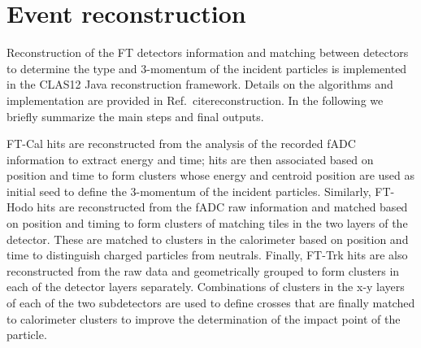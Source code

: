 \section{Event reconstruction}
Reconstruction of the FT detectors information and matching between detectors to determine the type and 3-momentum of the incident particles is implemented in the CLAS12 Java reconstruction framework. Details on the algorithms and implementation are provided in Ref.~cite{reconstruction}. In the following we briefly summarize the main steps and final outputs.

FT-Cal hits are reconstructed from the analysis of the recorded fADC information to extract energy and time; hits are then associated based on position and time to form clusters whose energy and centroid position are used as initial seed to define the 3-momentum of the incident particles. Similarly, FT-Hodo hits are reconstructed from the fADC raw information and matched based on position and timing to form clusters of matching tiles in the two layers of the detector. These are matched to clusters in the calorimeter based on position and time to distinguish charged particles from neutrals. Finally, FT-Trk hits are also reconstructed from the raw data and geometrically grouped to form clusters in each of the detector layers separately. Combinations of clusters in the x-y layers of each of the two subdetectors are used to define crosses that are finally matched to calorimeter clusters to improve the determination of the impact point of the particle.

